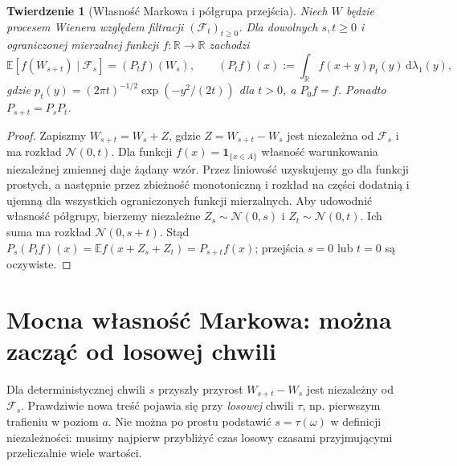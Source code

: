 \documentclass[11pt,a4paper,oneside]{report}
\numberwithin{equation}{chapter}
\theoremstyle{plain}
\newtheorem{twierdzenie}{Twierdzenie}[chapter]
\theoremstyle{definition}
\theoremstyle{remark}
\newcommand{\R}{\mathbb{R}}
\newcommand{\E}{\mathbb{E}}
\newcommand{\calF}{\mathcal{F}}
\newcommand{\ind}[1]{\mathbf{1}_{#1}}
\newcommand{\dd}{\mathrm{d}}
\newcommand{\Normal}{\mathcal{N}}
\begin{document}
\begin{twierdzenie}[Własność Markowa i półgrupa przejścia]
Niech $W$ będzie procesem Wienera względem filtracji
$(\calF_t)_{t\ge0}$. Dla dowolnych $s,t\ge0$
i ograniczonej mierzalnej funkcji $f:\R\to\R$ zachodzi
\[
\E[f(W_{s+t})\mid\calF_s]
=(P_tf)(W_s),\qquad
(P_tf)(x):=\int_\R f(x+y)p_t(y)\,\dd\lambda_1(y),
\]
gdzie $p_t(y)=(2\pi t)^{-1/2}\exp(-y^2/(2t))$ dla $t>0$,
a $P_0f=f$. Ponadto $P_{s+t}=P_sP_t$.
\end{twierdzenie}
\begin{proof}
Zapiszmy $W_{s+t}=W_s+Z$, gdzie $Z=W_{s+t}-W_s$
jest niezależna od $\calF_s$ i ma rozkład $\Normal(0,t)$.
Dla funkcji $f(x)=\ind{\{x\in A\}}$ własność
warunkowania niezależnej zmiennej daje żądany wzór.
Przez liniowość uzyskujemy go dla funkcji prostych, a
następnie przez zbieżność monotoniczną i rozkład na
części dodatnią i ujemną dla wszystkich ograniczonych
funkcji mierzalnych.
Aby udowodnić własność półgrupy, bierzemy niezależne
$Z_s\sim\Normal(0,s)$ i $Z_t\sim\Normal(0,t)$.
Ich suma ma rozkład $\Normal(0,s+t)$. Stąd
$P_s(P_tf)(x)=\E f(x+Z_s+Z_t)=P_{s+t}f(x)$;
przejścia $s=0$ lub $t=0$ są oczywiste.
\end{proof}

\section{Mocna własność Markowa: można zacząć od losowej chwili}
Dla deterministycznej chwili $s$ przyszły przyrost
$W_{s+t}-W_s$ jest niezależny od $\calF_s$.
Prawdziwie nowa treść pojawia się przy \emph{losowej}
chwili $\tau$, np. pierwszym trafieniu w poziom $a$.
Nie można po prostu podstawić $s=\tau(\omega)$ w definicji
niezależności: musimy najpierw przybliżyć czas losowy
czasami przyjmującymi przeliczalnie wiele wartości.
\end{document}
